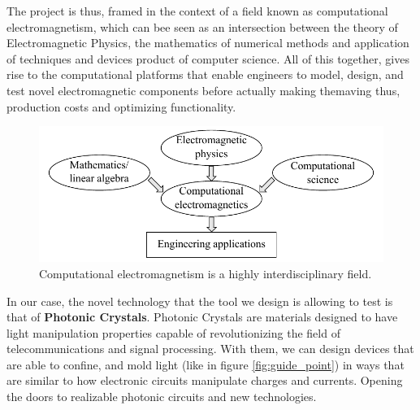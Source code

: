 The project is thus, framed in the context of a field known as computational electromagnetism, which can bee seen as an intersection between the theory of Electromagnetic Physics, the mathematics of numerical methods and application of techniques and devices  product of computer science. All of this together, gives rise to the computational platforms that enable engineers to model, design, and test novel electromagnetic components before actually making themaving thus, production costs and optimizing functionality.  
\begin{figure}
\centering
\includegraphics[scale=1]{./img/interdisciplinary.pdf}
\caption{Computational electromagnetism is a highly interdisciplinary field.  \cite{Jin2010}}
\label{fig:computational}
\end{figure}
In our case, the novel technology that the tool we design is allowing to test is that of \textbf{Photonic Crystals}. Photonic Crystals are materials designed to have light manipulation properties capable of revolutionizing the field of telecommunications and signal processing. With them, we can design devices that are able to confine, and mold light (like in figure \ref{fig:guide_point}) in ways that are similar to how electronic circuits manipulate charges and currents.  Opening the doors to realizable photonic circuits and new technologies.

